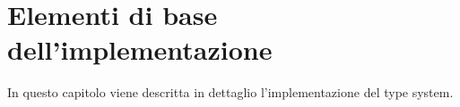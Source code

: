 \chapter{Elementi di base dell'implementazione}

In questo capitolo viene descritta in dettaglio l'implementazione del
type system.










